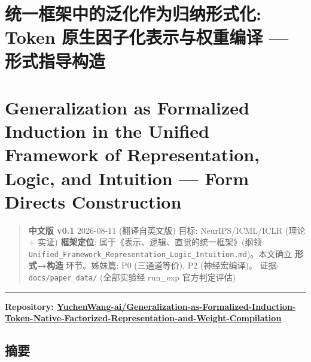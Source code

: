 \documentclass[
]{article}
\author{}
\date{}
\begin{document}
\section{统一框架中的泛化作为归纳形式化: Token 原生因子化表示与权重编译
---
形式指导构造}\label{ux7edfux4e00ux6846ux67b6ux4e2dux7684ux6cdbux5316ux4f5cux4e3aux5f52ux7eb3ux5f62ux5f0fux5316-token-ux539fux751fux56e0ux5b50ux5316ux8868ux793aux4e0eux6743ux91cdux7f16ux8bd1-ux5f62ux5f0fux6307ux5bfcux6784ux9020}

\section{Generalization as Formalized Induction in the Unified Framework
of Representation, Logic, and Intuition --- Form Directs
Construction}\label{generalization-as-formalized-induction-in-the-unified-framework-of-representation-logic-and-intuition-form-directs-construction}

\begin{quote}
\textbf{中文版 v0.1} \textbar{} 2026-08-11 (翻译自英文版) 目标:
NeurIPS/ICML/ICLR (理论 + 实证) \textbf{框架定位}:
属于《表示、逻辑、直觉的统一框架》(纲领:
\texttt{Unified\_Framework\_Representation\_Logic\_Intuition.md})。本文确立
\textbf{形式→构造} 环节。姊妹篇: P0 (三通道等价), P2 (神经宏编译)。
证据: \texttt{docs/paper\_data/} (全部实验经 run\_exp 官方判定评估)
\end{quote}

\begin{center}\rule{0.5\linewidth}{0.5pt}\end{center}

\textbf{Repository:
\href{https://github.com/YuchenWang-ai/Generalization-as-Formalized-Induction-Token-Native-Factorized-Representation-and-Weight-Compilation}{YuchenWang-ai/Generalization-as-Formalized-Induction-Token-Native-Factorized-Representation-and-Weight-Compilation}}

\subsection{摘要}\label{ux6458ux8981}
\end{document}

